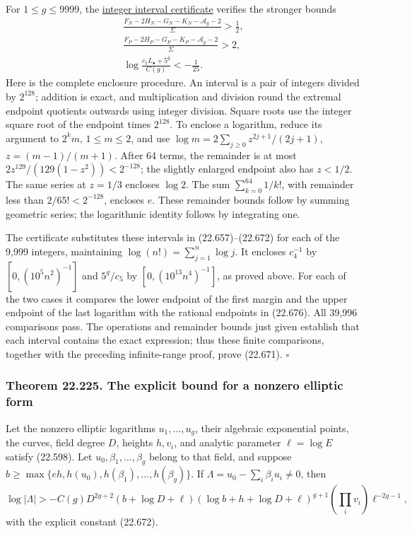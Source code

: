 \documentclass[
  11pt,
  a4paper,
]{article}
\begin{document}
For \(1\le g\le9999\), the
\href{https://kokunoyumeto.github.io/open-math-courses-public/courses/TR-BAKER/verification/lesson22/elliptic-numerical-extrapolation-check.py}{integer
interval certificate} verifies the stronger bounds \[
\begin{gathered}
 \frac{F_N-2H_N-G_N-K_N-\mathcal A_g-2}{\Sigma}>\frac12,\\
 \frac{F_P-2H_P-G_P-K_P-\mathcal A_g-2}{\Sigma}>2,\\
 \log\frac{c_5L_\bullet+5^g}{C(g)}<-\frac1{25}.
\end{gathered}
\tag{22.676}
\] Here is the complete enclosure procedure. An interval is a pair of
integers divided by \(2^{128}\); addition is exact, and multiplication
and division round the extremal endpoint quotients outwards using
integer division. Square roots use the integer square root of the
endpoint times \(2^{128}\). To enclose a logarithm, reduce its argument
to \(2^k m\), \(1\le m\le2\), and use
\(\log m=2\sum_{j\ge0}z^{2j+1}/(2j+1)\), \(z=(m-1)/(m+1)\). After 64
terms, the remainder is at most \(2z^{129}/(129(1-z^2))<2^{-128}\); the
slightly enlarged endpoint also has \(z<1/2\). The same series at
\(z=1/3\) encloses \(\log2\). The sum \(\sum_{k=0}^{64}1/k!\), with
remainder less than \(2/65!<2^{-128}\), encloses \(e\). These remainder
bounds follow by summing geometric series; the logarithmic identity
follows by integrating one.

The certificate substitutes these intervals in (22.657)--(22.672) for
each of the 9,999 integers, maintaining \(\log(n!)=\sum_{j=1}^n\log j\).
It encloses \(c_4^{-1}\) by \([0,(10^5n^2)^{-1}]\) and \(5^g/c_5\) by
\([0,(10^{13}n^4)^{-1}]\), as proved above. For each of the two cases it
compares the lower endpoint of the first margin and the upper endpoint
of the last logarithm with the rational endpoints in (22.676). All
39,996 comparisons pass. The operations and remainder bounds just given
establish that each interval contains the exact expression; thus these
finite comparisons, together with the preceding infinite-range proof,
prove (22.671). \(\square\)

\subsubsection{Theorem 22.225. The explicit bound for a nonzero elliptic
form}\label{theorem-22.225.-the-explicit-bound-for-a-nonzero-elliptic-form}

Let the nonzero elliptic logarithms \(u_1,\ldots,u_g\), their algebraic
exponential points, the curves, field degree \(D\), heights \(h,v_i\),
and analytic parameter \(\ell=\log E\) satisfy (22.598). Let
\(u_0,\beta_1,\ldots,\beta_g\) belong to that field, and suppose
\(b\ge\max\{eh,h(u_0),h(\beta_1),\ldots,h(\beta_g)\}\). If
\(\Lambda=u_0-\sum_i\beta_i u_i\ne0\), then \[
 \log|\Lambda|>
 -C(g)D^{2g+2}(b+\log D+\ell)
       (\log b+h+\log D+\ell)^{g+1}
       \left(\prod_i v_i\right)\ell^{-2g-1},
 \tag{22.677}
\] with the explicit constant (22.672).
\end{document}
